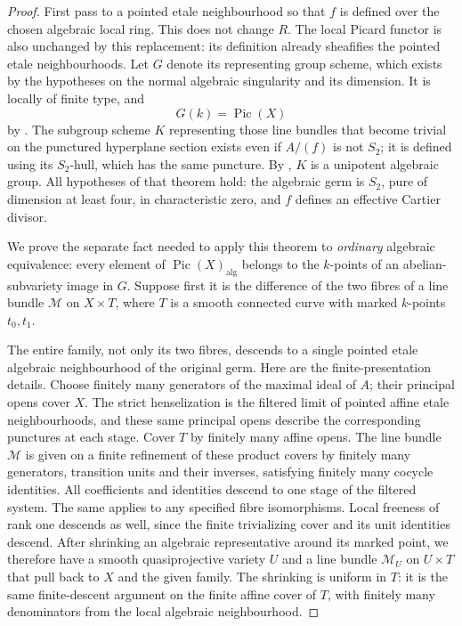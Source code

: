 \begin{proof}
First pass to a pointed etale neighbourhood so that
$f$ is defined over the chosen algebraic local ring.
This does not change $R$. The local Picard functor is
also unchanged by this replacement: its definition
already sheafifies the pointed etale neighbourhoods.
Let $G$ denote its representing group scheme, which
exists by the hypotheses on the normal algebraic
singularity and its dimension. It is locally of finite
type, and
\[
                    G(k)=\operatorname{Pic}(X)
\]
by \citet[Definition 3.3 and Section 3.5,
pp.~467--469]{D_Kollar2016LocalPicard}.
The subgroup scheme $K$ representing those line
bundles that become trivial on the punctured
hyperplane section exists even if $A/(f)$ is not
$S_2$; it is defined using its $S_2$-hull, which has
the same puncture. By
\citet[Theorem 1.7(i), p.~463, and Definition 3.3,
p.~468]{D_Kollar2016LocalPicard}, $K$ is a unipotent
algebraic group. All hypotheses of that theorem hold:
the algebraic germ is $S_2$, pure of dimension at least
four, in characteristic zero, and $f$ defines an
effective Cartier divisor.

We prove the separate fact needed to apply this
theorem to \emph{ordinary} algebraic equivalence:
every element of $\operatorname{Pic}(X)_{\mathrm{alg}}$
belongs to the $k$-points of an abelian-subvariety image
in $G$. Suppose first it is the difference of the two
fibres of a line bundle $\mathcal M$ on $X\times T$,
where $T$ is a smooth connected curve with marked
$k$-points $t_0,t_1$.

The entire family, not only its two fibres, descends
to a single pointed etale algebraic neighbourhood of
the original germ. Here are the finite-presentation
details. Choose finitely many generators of the
maximal ideal of $A$; their principal opens cover
$X$. The strict henselization is the filtered limit
of pointed affine etale neighbourhoods, and these
same principal opens describe the corresponding
punctures at each stage. Cover $T$ by finitely many
affine opens. The line bundle $\mathcal M$ is given
on a finite refinement of these product covers by
finitely many generators, transition units and their
inverses, satisfying finitely many cocycle identities.
All coefficients and identities descend to one stage
of the filtered system. The same applies to any
specified fibre isomorphisms. Local freeness of rank
one descends as well, since the finite trivializing
cover and its unit identities descend. After
shrinking an algebraic representative around its
marked point, we therefore have a smooth
quasiprojective variety $U$ and a line bundle
$\mathcal M_U$ on $U\times T$ that pull back to
$X$ and the given family. The shrinking is uniform
in $T$: it is the same finite-descent argument on
the finite affine cover of $T$, with finitely many
denominators from the local algebraic neighbourhood.


\end{proof}
